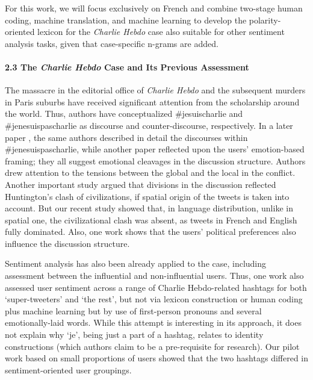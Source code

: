 For this work, we will focus exclusively on French and combine two-stage human coding, machine translation, and machine learning to develop the polarity-oriented lexicon for the \textit{Charlie Hebdo} case also suitable for other sentiment analysis tasks, given that case-specific n-grams are added.

\paragraph{2.3 The \textit{Charlie Hebdo} Case and Its Previous Assessment} The massacre in the editorial office of \textit{Charlie Hebdo} and the subsequent murders in Paris suburbs have received significant attention from the scholarship around the world. Thus, authors \cite{GigliettoLee} have conceptualized \#jesuischarlie and \#jenesuispascharlie as discourse and counter-discourse, respectively. In a later paper \cite{GigliettoLee2017}, the same authors described in detail the discourses within \#jenesuispascharlie, while another paper \cite{Rosas} reflected upon the users’ emotion-based framing; they all suggest emotional cleavages in the discussion structure. Authors \cite{VauclairVauclair} drew attention to the tensions between the global and the local in the conflict. Another important study \cite{AnKwakMejova} argued that divisions in the discussion reflected Huntington’s clash of civilizations, if spatial origin of the tweets is taken into account. But our recent study \cite{BodrunovaSmoliarovaBlekanov} showed that, in language distribution, unlike in spatial one, the civilizational clash was absent, as tweets in French and English fully dominated. Also, one work \cite{RatinaudSmyrnaios} shows that the users’ political preferences also influence the discussion structure.

Sentiment analysis has also been already applied to the case, including assessment between the influential and non-influential users. Thus, one work \cite{ShaikhFeldmanBarach} also assessed user sentiment across a range of Charlie Hebdo-related hashtags for both ‘super-tweeters’ and ‘the rest’, but not via lexicon construction or human coding plus machine learning but by use of first-person pronouns and several emotionally-laid words. While this attempt is interesting in its approach, it does not explain why ‘je’, being just a part of a hashtag, relates to identity constructions (which authors claim to be a pre-requisite for research). Our pilot work based on small proportions of users \cite{BodrunovaBlekanovKukarkinCH} showed that the two hashtags differed in sentiment-oriented user groupings.

